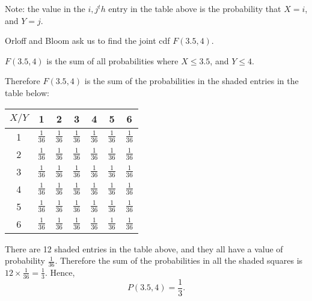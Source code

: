 \documentclass[a4paper,11pt]{article}
\begin{document}
Note: the value in the $i,j^th$ entry in the table above is the probability that
$X=i$, and $Y=j$.

Orloff and Bloom ask us to find the joint cdf $F \left(3.5, 4 \right)$.

$F\left(3.5, 4 \right)$ is the sum of all probabilities where $X \leq 3.5$, and
$Y \leq 4$.

Therefore $F \left( 3.5, 4 \right)$ is the sum of the probabilities in the
shaded entries in the table below:


\begin{center}
  \begin{tabular}{ | c | c | c | c | c | c | c |}
    \hline
    $X/Y$ & 1  & 2  & 3  & 4  & 5  &  6    \\ \hline
    1     & \cellcolor{blue!25} $\frac{1}{36}$  & \cellcolor{blue!25} $\frac{1}{36}$ & \cellcolor{blue!25} $\frac{1}{36}$ & \cellcolor{blue!25} $\frac{1}{36}$ & $\frac{1}{36}$ & $\frac{1}{36}$   \\ \hline
    2     & \cellcolor{blue!25} $\frac{1}{36}$  & \cellcolor{blue!25} $\frac{1}{36}$ & \cellcolor{blue!25} $\frac{1}{36}$ & \cellcolor{blue!25} $\frac{1}{36}$ & $\frac{1}{36}$ & $\frac{1}{36}$   \\ \hline
    3     & \cellcolor{blue!25} $\frac{1}{36}$  & \cellcolor{blue!25} $\frac{1}{36}$ & \cellcolor{blue!25} $\frac{1}{36}$ & \cellcolor{blue!25} $\frac{1}{36}$ & $\frac{1}{36}$ & $\frac{1}{36}$   \\ \hline
    4     &  $\frac{1}{36}$  & $\frac{1}{36}$ & $\frac{1}{36}$ & $\frac{1}{36}$ & $\frac{1}{36}$ & $\frac{1}{36}$   \\ \hline
    5     &  $\frac{1}{36}$  & $\frac{1}{36}$ & $\frac{1}{36}$ & $\frac{1}{36}$ & $\frac{1}{36}$ & $\frac{1}{36}$   \\ \hline
    6     &  $\frac{1}{36}$  & $\frac{1}{36}$ & $\frac{1}{36}$ & $\frac{1}{36}$ & $\frac{1}{36}$ & $\frac{1}{36}$   \\ \hline
  \end{tabular}
\end{center}

There are 12 shaded entries in the table above, and they all have a value of
probability $\frac{1}{36}$.  Therefore the sum of the probabilities in all
the shaded squares is $ 12 \times \frac{1}{36} = \frac{1}{3}$.  Hence,
\begin{equation}
  P \left( 3.5, 4 \right) = \frac{1}{3}.
\end{equation}

\printbibliography{}
\end{document}

